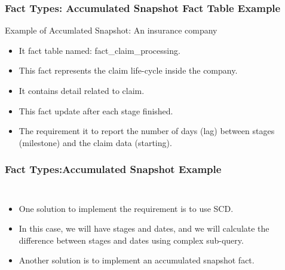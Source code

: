 \begin{frame}
    \frametitle{Fact Types: Accumulated Snapshot Fact Table Example}
    Example of Accumlated Snapshot: An insurance company
    \begin{itemize}
        \item It fact table named: fact\_claim\_processing.
        \item This fact represents the claim life-cycle inside the company.
        \item It contains detail related to claim.
        \item This fact update after each stage finished.
        \item The requirement it to report the number of days (lag) between stages (milestone) and the claim data (starting).
    \end{itemize}
    \vspace{5 mm}
    
\end{frame}

\begin{frame}
    \frametitle{Fact Types:Accumulated Snapshot Example}
    \setlength{\leftmargini}{2em}    
    \begin{columns}[T,onlytextwidth]
                \setlength{\partopsep}{3pt}%
                \begin{itemize}\vspace{-5mm}
                    \item One solution to implement the requirement is to use SCD.
                    \item In this case, we will have stages and dates, and we will calculate the difference between stages and dates using complex sub-query.
                    \item Another solution is to implement an accumulated snapshot fact.
                \end{itemize}
                \setlength{\partopsep}{3pt}
                
   \end{columns}    
\end{frame}

